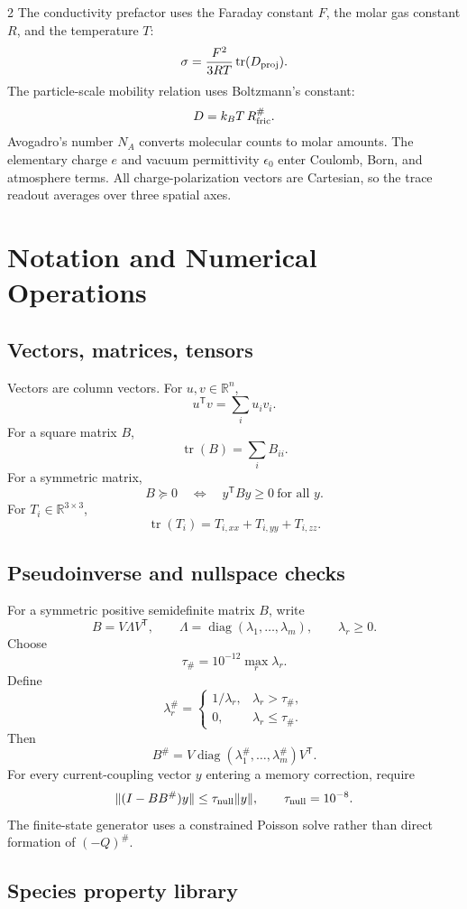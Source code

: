 \documentclass[10pt]{article}
\newcommand{\T}{\mathsf{T}}
\newcommand{\tr}{\operatorname{tr}}
\newcommand{\diag}{\operatorname{diag}}
\begin{document}
\begin{multicols}{2}
The conductivity prefactor uses the Faraday constant \(F\), the molar gas
constant \(R\), and the temperature \(T\):
\[
\sigma=\frac{F^2}{3RT}\operatorname{tr}(D_{\rm proj}).
\]
The particle-scale mobility relation uses Boltzmann's constant:
\[
D=k_BT\,R_{\rm fric}^{\#}.
\]
Avogadro's number \(N_A\) converts molecular counts to molar amounts. The
elementary charge \(e\) and vacuum permittivity \(\epsilon_0\) enter Coulomb,
Born, and atmosphere terms. All charge-polarization vectors are Cartesian, so
the trace readout averages over three spatial axes.

\section{Notation and Numerical Operations}

\subsection{Vectors, matrices, tensors}

Vectors are column vectors. For \(u,v\in\mathbb R^n\),
\[
u^\T v=\sum_i u_i v_i.
\]
For a square matrix \(B\),
\[
\tr(B)=\sum_iB_{ii}.
\]
For a symmetric matrix,
\[
B\succeq0
\quad\Longleftrightarrow\quad
y^\T By\ge0\ \text{for all }y.
\]
For \(T_i\in\mathbb R^{3\times3}\),
\[
\tr(T_i)=T_{i,xx}+T_{i,yy}+T_{i,zz}.
\]

\subsection{Pseudoinverse and nullspace checks}

For a symmetric positive semidefinite matrix \(B\), write
\[
B=V\Lambda V^\T,
\qquad
\Lambda=\diag(\lambda_1,\ldots,\lambda_m),
\qquad
\lambda_r\ge0.
\]
Choose
\[
\tau_\#=10^{-12}\max_r\lambda_r.
\]
Define
\[
\lambda_r^\#=
\begin{cases}
1/\lambda_r, & \lambda_r>\tau_\#,\\
0, & \lambda_r\le\tau_\#.
\end{cases}
\]
Then
\[
B^\#=V\diag(\lambda_1^\#,\ldots,\lambda_m^\#)V^\T.
\]
For every current-coupling vector \(y\) entering a memory correction, require
\[
\|(I-BB^\#)y\|\le\tau_{\rm null}\|y\|,
\qquad
\tau_{\rm null}=10^{-8}.
\]
The finite-state generator uses a constrained Poisson solve rather than direct
formation of \((-Q)^\#\).

\subsection{Species property library}


\end{multicols}
\end{document}
